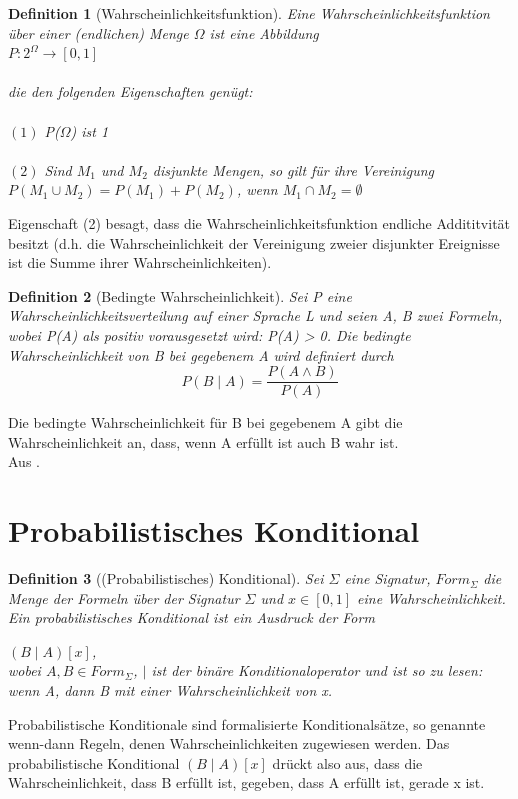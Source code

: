 \documentclass[a4paper, 11pt]{book}
\newtheorem{Def}{Definition }[section]
\begin{document}
{\begin{Def}[Wahrscheinlichkeitsfunktion] 
Eine Wahrscheinlichkeitsfunktion über einer (endlichen) Menge $\Omega$ ist eine Abbildung\\

$P : 2^{\Omega} \rightarrow [0, 1] $\\
\\die den folgenden Eigenschaften genügt:\\
\\$ (1 )$ P($\Omega$) ist 1\\
\\$ (2) $ Sind $M_{1}$ und $M_{2}$ disjunkte Mengen, so gilt für ihre Vereinigung\\

$P(M_{1} \cup M_{2}) = P(M_{1}) + P(M_{2})$, wenn $M_{1} \cap M_{2} = \emptyset$
\end{Def}   
Eigenschaft (2) besagt, dass die Wahrscheinlichkeitsfunktion endliche Addititvität besitzt (d.h. die Wahrscheinlichkeit der Vereinigung zweier disjunkter Ereignisse ist die Summe ihrer Wahrscheinlichkeiten).\\

\begin{Def}[Bedingte Wahrscheinlichkeit] \label{sec: bed Wahr}
Sei P eine Wahrscheinlichkeitsverteilung auf einer Sprache L und seien A, B zwei Formeln, wobei P(A) als positiv vorausgesetzt wird: P(A) > 0. Die bedingte Wahrscheinlichkeit von B bei gegebenem A wird definiert durch\\
\[P( B\mid A ) = \frac{P(A\wedge B)}{P(A)}\]

\end{Def}
Die bedingte Wahrscheinlichkeit für B bei gegebenem A gibt die Wahrscheinlichkeit an, dass, wenn A erfüllt ist auch B wahr ist.\\
Aus \cite{BKI08}.
\newpage

\section{Probabilistisches Konditional}
\label{probKond}
\begin{Def}[(Probabilistisches) Konditional] 
Sei $ \Sigma $ eine Signatur, $ Form_{\Sigma} $ die Menge der Formeln über der Signatur $ \Sigma $ und $ x \in [0, 1] $ eine Wahrscheinlichkeit.
Ein probabilistisches Konditional ist ein Ausdruck der Form

\hspace{3 cm} $ (B \mid A)[x] $, \\
wobei $ A, B \in Form_\Sigma $, $ \mid $ ist der binäre Konditionaloperator und ist so zu lesen: wenn A, dann B mit einer Wahrscheinlichkeit von x. 
\end{Def}
Probabilistische Konditionale sind formalisierte Konditionalsätze, so genannte wenn-dann Regeln, denen Wahrscheinlichkeiten zugewiesen werden.
Das probabilistische Konditional $ (B \mid A)[x] $ drückt also aus, dass die Wahrscheinlichkeit, dass B erfüllt ist, gegeben, dass A erfüllt ist, gerade x ist.




}
\end{document}
